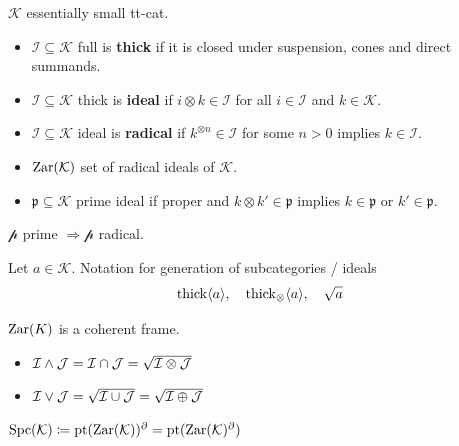 \begin{definition} $\mathcal{K} $ essentially small tt-cat.
\begin{itemize}[topsep=-6pt, itemsep=0pt]
    \item $\mathcal{I} \subseteq \mathcal{K}  $ full is \textbf{thick} if it is closed under suspension, cones and direct summands. 
    \item $\mathcal{I} \subseteq \mathcal{K}  $ thick is \textbf{ideal} if $i \otimes k \in \mathcal{I}$ for all $i \in \mathcal{I}$ and $k \in \mathcal{K}$.
    \item $\mathcal{I} \subseteq \mathcal{K}  $ ideal is \textbf{radical} if $k ^{ \otimes n} \in \mathcal{I}$ for some $n > 0$ implies $k \in \mathcal{I}$.
    \item $\operatorname{Zar}(\mathcal{K})$ set of radical ideals of $\mathcal{K}$.
    \item $\mathfrak{p} \subseteq \mathcal{K}  $ prime ideal if proper and $k \otimes k' \in \mathfrak{p}$ implies $k \in \mathfrak{p}$ or $k' \in \mathfrak{p}$.
\end{itemize}
\end{definition}

\begin{proposition} $\mathcal{p}$ prime $ \Rightarrow \mathcal{p} $ radical.
\end{proposition}

\begin{definition} Let $a \in \mathcal{K}$. Notation for generation of subcategories / ideals
\[
\operatorname{thick} \langle a \rangle, \quad \operatorname{thick}_{ \otimes } \langle a \rangle, \quad \sqrt{a}
\]
\end{definition}

\begin{theorem} $\operatorname{Zar}(K)$ is a coherent frame. 
\begin{itemize}[topsep=-6pt, itemsep=0pt]
    \item $\mathcal{I} \wedge \mathcal{J}  = \mathcal{I} \cap \mathcal{J} = \sqrt{\mathcal{I} \otimes \mathcal{J}}$ 
    \item $\mathcal{I} \vee \mathcal{J}  = \sqrt{\mathcal{I} \cup \mathcal{J}} = \sqrt{\mathcal{I} \oplus  \mathcal{J}}$ 
\end{itemize}
\end{theorem}

\begin{definition} $\operatorname{Spc}(\mathcal{K}) \coloneqq \operatorname{pt}(\operatorname{Zar}(\mathcal{K})) ^{\partial } = \operatorname{pt} (\operatorname{Zar}(\mathcal{K})^{\partial })$
\end{definition}

